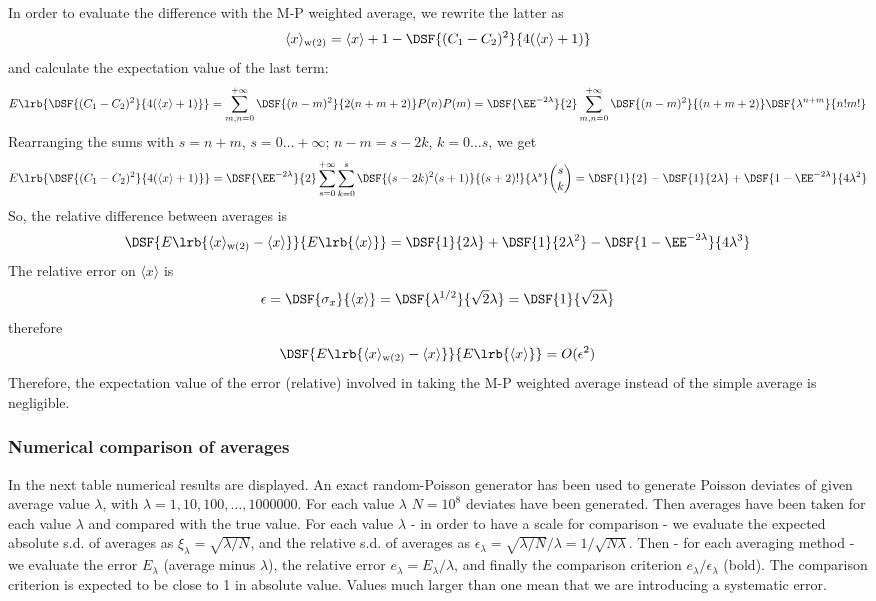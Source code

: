 In order to evaluate the difference with the M-P weighted average, we rewrite the latter as
\[
\langle x \rangle_{\mathrm{w(2)}}=\langle x \rangle + 1 -\DSF{(C_1-C_2)^2}{4(\langle x \rangle+1)}
\]
and calculate the expectation value of the last term:
\[
E\lrb{\DSF{(C_1-C_2)^2}{4(\langle x \rangle+1)}} = 
 \mathop{\sum}_{m,n=0}^{+\infty}
 \DSF{(n-m)^2}{2(n+m+2) }P(n)P(m)=\DSF{\EE^{-2\lambda}}{2}
 \mathop{\sum}_{m,n=0}^{+\infty}
 \DSF{(n-m)^2}{(n+m+2) }\DSF{\lambda^{n+m}}{n!m!}
\]
Rearranging the sums with $s=n+m$, $s=0\ldots +\infty$; $n-m=s-2k$, $k=0\ldots s$,
we get
\[
E\lrb{\DSF{(C_1-C_2)^2}{4(\langle x \rangle+1)}} = 
\DSF{\EE^{-2\lambda}}{2}
 \mathop{\sum}_{s=0}^{+\infty}
  \mathop{\sum}_{k=0}^{s}
 \DSF{(s-2k)^2(s+1)}{(s+2)! }{\lambda^{s}}
 \binom{s}{k}=\DSF{1}{2}-\DSF{1}{2\lambda}+\DSF{1-\EE^{-2\lambda}}{4\lambda^2}
\]
So, the relative difference between averages is
\[
\DSF{E\lrb{\langle x \rangle_{\mathrm{w(2)}}-\langle x \rangle}}{E\lrb{\langle x \rangle}}=
\DSF{1}{2\lambda}+\DSF{1}{2\lambda^2}-\DSF{1-\EE^{-2\lambda}}{4\lambda^3}
\]
The relative error on $\langle x \rangle$ is
\[
\epsilon = \DSF{\sigma_x}{\langle x \rangle} = 
\DSF{\lambda^{1/2}}{\sqrt{2} \lambda}=\DSF{1}{\sqrt{2\lambda}}
\]
therefore 
\[
\DSF{E\lrb{\langle x \rangle_{\mathrm{w(2)}}-\langle x \rangle}}{E\lrb{\langle x \rangle}}=
O(\epsilon^2)
\]
Therefore, the expectation value of the error (relative) involved in taking 
the M-P weighted average instead of the simple average is negligible.



\subsubsection{Numerical comparison of averages}

In the next table numerical results are displayed. An exact random-Poisson generator has been used to generate Poisson deviates of given average value 
$\lambda$, with $\lambda=1,10,100,\ldots,1000000$. For each value $\lambda$
$N=10^8$ deviates have been generated. Then averages have been taken for each value $\lambda$ and compared with the true value. 
For each value $\lambda$ - in order to have a scale for comparison - 
we evaluate the expected absolute s.d. of averages as $\xi_\lambda=\sqrt{\lambda/N}$, and the relative s.d. of averages as $\epsilon_\lambda=\sqrt{\lambda/N}/\lambda=1/\sqrt{N\lambda}$. Then - for each averaging method - we evaluate the error $E_\lambda$ (average minus $\lambda$), 
the relative error $e_\lambda=E_\lambda/\lambda$, and finally the comparison criterion $e_\lambda/\epsilon_\lambda$ (bold). The comparison criterion is expected to be close to 1 in absolute value. Values much larger than one mean that we are introducing a systematic error.

